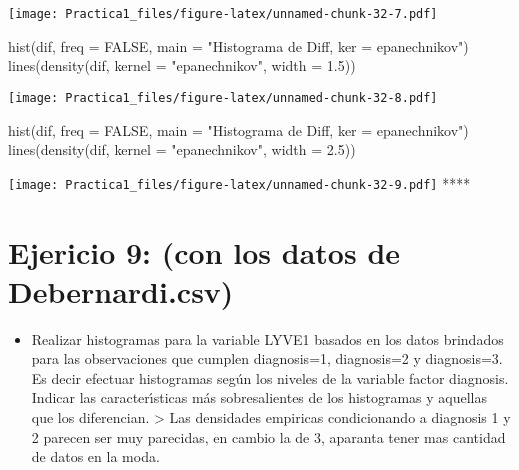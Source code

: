 \documentclass[
]{article}
\newenvironment{Shaded}{\begin{snugshade}}{\end{snugshade}}
\newcommand{\AttributeTok}[1]{\textcolor[rgb]{0.77,0.63,0.00}{#1}}
\newcommand{\ConstantTok}[1]{\textcolor[rgb]{0.00,0.00,0.00}{#1}}
\newcommand{\FloatTok}[1]{\textcolor[rgb]{0.00,0.00,0.81}{#1}}
\newcommand{\FunctionTok}[1]{\textcolor[rgb]{0.00,0.00,0.00}{#1}}
\newcommand{\NormalTok}[1]{#1}
\newcommand{\StringTok}[1]{\textcolor[rgb]{0.31,0.60,0.02}{#1}}
\providecommand{\tightlist}{%
  \setlength{\itemsep}{0pt}\setlength{\parskip}{0pt}}
\begin{document}
\texttt{[image: Practica1\_files/figure-latex/unnamed-chunk-32-7.pdf]}

\begin{Shaded}
\begin{Highlighting}[]
\FunctionTok{hist}\NormalTok{(dif, }\AttributeTok{freq =} \ConstantTok{FALSE}\NormalTok{, }\AttributeTok{main =} \StringTok{"Histograma de Diff, ker = epanechnikov"}\NormalTok{)}
\FunctionTok{lines}\NormalTok{(}\FunctionTok{density}\NormalTok{(dif, }\AttributeTok{kernel =} \StringTok{"epanechnikov"}\NormalTok{, }\AttributeTok{width =} \FloatTok{1.5}\NormalTok{))}
\end{Highlighting}
\end{Shaded}

\texttt{[image: Practica1\_files/figure-latex/unnamed-chunk-32-8.pdf]}

\begin{Shaded}
\begin{Highlighting}[]
\FunctionTok{hist}\NormalTok{(dif, }\AttributeTok{freq =} \ConstantTok{FALSE}\NormalTok{, }\AttributeTok{main =} \StringTok{"Histograma de Diff, ker = epanechnikov"}\NormalTok{)}
\FunctionTok{lines}\NormalTok{(}\FunctionTok{density}\NormalTok{(dif, }\AttributeTok{kernel =} \StringTok{"epanechnikov"}\NormalTok{, }\AttributeTok{width =} \FloatTok{2.5}\NormalTok{))}
\end{Highlighting}
\end{Shaded}

\texttt{[image: Practica1\_files/figure-latex/unnamed-chunk-32-9.pdf]}
****

\hypertarget{ejericio-9-con-los-datos-de-debernardi.csv}{%
\section{Ejericio 9: (con los datos de
Debernardi.csv)}\label{ejericio-9-con-los-datos-de-debernardi.csv}}

\begin{itemize}
\tightlist
\item
  Realizar histogramas para la variable LYVE1 basados en los datos
  brindados para las observaciones que cumplen diagnosis=1, diagnosis=2
  y diagnosis=3. Es decir efectuar histogramas según los niveles de la
  variable factor diagnosis. Indicar las caracterı́sticas más
  sobresalientes de los histogramas y aquellas que los diferencian.
  \textgreater{} Las densidades empiricas condicionando a diagnosis 1 y
  2 parecen ser muy parecidas, en cambio la de 3, aparanta tener mas
  cantidad de datos en la moda.
\end{itemize}
\end{document}

